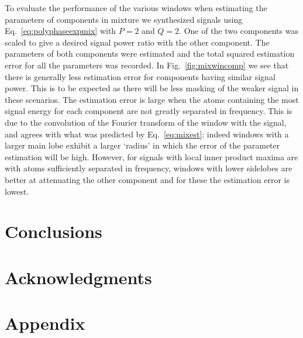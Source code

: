 \documentclass[twoside,a4paper]{article}
\begin{document}
\begin{figure*}[ht]
    \centerline{\texttt{[image: \{comp\_offset\_chirp\_est\_err]}.eps}}
\caption{\label{fig:mixwincomp}}
\end{figure*}

To evaluate the performance of the various windows when estimating the
parameters of components in mixture we synthesized signals using
Eq.~\ref{eq:polyphaseexpmix} with $P=2$ and $Q=2$. One of the two components was
scaled to give a desired signal power ratio with the other component. The
parameters of both components were estimated and the total squared estimation
error for all the parameters was recorded. In Fig.~\ref{fig:mixwincomp} we see
that there is generally less estimation error for components having similar
signal power. This is to be expected as there will be less masking of the weaker
signal in these scenarios. The estimation error is large when the atoms
containing the most signal energy for each component are not greatly separated
in frequency. This is due to the convolution of the Fourier transform of
the window with the signal, and agrees with what was predicted by
Eq.~\ref{eq:mixest}: indeed windows with a larger main lobe exhibit a
larger `radius' in which the error of the parameter estimation will be high.
However, for signals with local inner product maxima are with atoms sufficiently
separated in frequency, windows with lower sidelobes are better at attenuating
the other component and for these the estimation error is lowest.

\section{Conclusions}

\section{Acknowledgments}



\section{Appendix}
\end{document}
